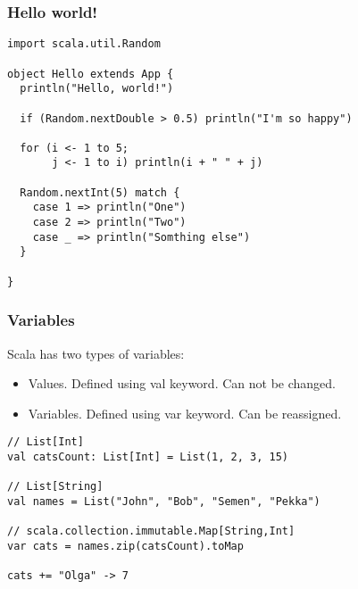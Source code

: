 \documentclass{beamer}
\begin{document}
\begin{frame}[fragile]
\frametitle{Hello world!}

\begin{lstlisting}
import scala.util.Random

object Hello extends App {
  println("Hello, world!")

  if (Random.nextDouble > 0.5) println("I'm so happy")

  for (i <- 1 to 5;
       j <- 1 to i) println(i + " " + j)

  Random.nextInt(5) match {
    case 1 => println("One")
    case 2 => println("Two")
    case _ => println("Somthing else")
  }

}
\end{lstlisting}

\end{frame}

\begin{frame}[fragile]
\frametitle{Variables}
Scala has two types of variables:
\begin{itemize}
  \item Values. Defined using val keyword. Can not be changed.
  \item Variables. Defined using var keyword. Can be reassigned.
\end{itemize}

\begin{example}
\begin{lstlisting}
// List[Int]
val catsCount: List[Int] = List(1, 2, 3, 15)

// List[String] 
val names = List("John", "Bob", "Semen", "Pekka")

// scala.collection.immutable.Map[String,Int]
var cats = names.zip(catsCount).toMap

cats += "Olga" -> 7
\end{lstlisting}
\end{example}

\end{frame}
\end{document}
